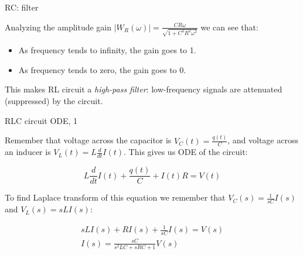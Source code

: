 \documentclass{beamer}
\begin{document}
\begin{frame}{RC: filter}
	\begin{flushleft}
		
		Analyzing the amplitude gain $| W_R(\omega) | 
		=  \frac{ CR\omega}{\sqrt{1 + C^2 R^2 \omega^2}} $ we can see that:
		
		\bigskip
		
		\begin{itemize}
			\item As frequency tends to infinity, the gain goes to 1.
			
			\item As frequency tends to zero, the gain goes to 0.
		\end{itemize}
		
		\bigskip
		
		This makes RL circuit a \emph{high-pass filter}: low-frequency signals are attenuated (suppressed) by the circuit.
		
	\end{flushleft}
\end{frame}



\begin{frame}{RLC circuit ODE, 1}
	\begin{flushleft}
		
		Remember that voltage across the capacitor is $V_C(t) = \frac{q(t)}{C}$, and voltage across an inducer is $V_L(t) = L \frac{d}{dt}I(t)$. This gives us ODE of the circuit:
		
		\begin{equation}
			L \frac{d}{dt}I(t) + \frac{q(t)}{C} + I(t)R = V(t)
		\end{equation}
	
		To find Laplace transform of this equation we remember that $V_C(s) = \frac{1}{sC} I(s)$ and $V_L(s) = sLI(s)$:
		
		\begin{align}
			 sLI(s) + RI(s) + \frac{1}{sC} I(s) = V(s) \\
			 I(s) = \frac{sC}{s^2 LC + s RC + 1} V(s)
		\end{align}
		
		
	\end{flushleft}
\end{frame}
\end{document}
